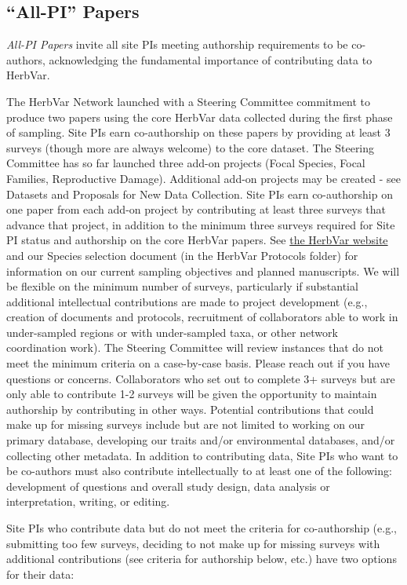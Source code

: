 \documentclass[
  letterpaper,
  oneside,
  open=any]{scrbook}
\begin{document}
\subsection{``All-PI'' Papers}\label{all-pi-papers}

\emph{All-PI Papers} invite all site PIs meeting authorship requirements
to be co-authors, acknowledging the fundamental importance of
contributing data to HerbVar.

The HerbVar Network launched with a Steering Committee commitment to
produce two papers using the core HerbVar data collected during the
first phase of sampling. Site PIs earn co-authorship on these papers by
providing at least 3 surveys (though more are always welcome) to the
core dataset. The Steering Committee has so far launched three add-on
projects (Focal Species, Focal Families, Reproductive Damage).
Additional add-on projects may be created - see Datasets and Proposals
for New Data Collection. Site PIs earn co-authorship on one paper from
each add-on project by contributing at least three surveys that advance
that project, in addition to the minimum three surveys required for Site
PI status and authorship on the core HerbVar papers. See
\href{www.herbvar.org}{the HerbVar website} and our Species selection
document (in the HerbVar Protocols folder) for information on our
current sampling objectives and planned manuscripts. We will be flexible
on the minimum number of surveys, particularly if substantial additional
intellectual contributions are made to project development (e.g.,
creation of documents and protocols, recruitment of collaborators able
to work in under-sampled regions or with under-sampled taxa, or other
network coordination work). The Steering Committee will review instances
that do not meet the minimum criteria on a case-by-case basis. Please
reach out if you have questions or concerns. Collaborators who set out
to complete 3+ surveys but are only able to contribute 1-2 surveys will
be given the opportunity to maintain authorship by contributing in other
ways. Potential contributions that could make up for missing surveys
include but are not limited to working on our primary database,
developing our traits and/or environmental databases, and/or collecting
other metadata. In addition to contributing data, Site PIs who want to
be co-authors must also contribute intellectually to at least one of the
following: development of questions and overall study design, data
analysis or interpretation, writing, or editing.

Site PIs who contribute data but do not meet the criteria for
co-authorship (e.g., submitting too few surveys, deciding to not make up
for missing surveys with additional contributions (see criteria for
authorship below, etc.) have two options for their data:
\end{document}
